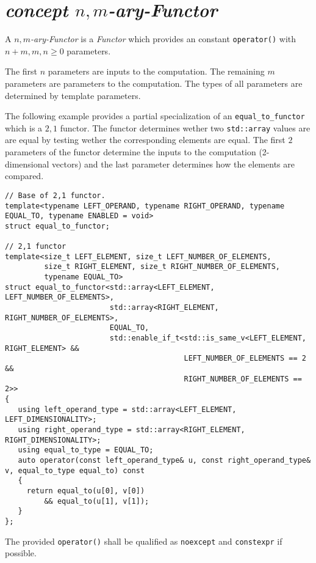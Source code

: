 \section{\textit{concept $n,m$-ary-Functor}}
A \textit{$n,m$-ary-Functor} is a \textit{Functor} which provides an constant \texttt{operator()} with $n+m, m, n \geq 0$ parameters.\newline

\noindent{}The first $n$ parameters are inputs to the computation.
The remaining $m$ parameters are parameters to the computation.
The types of all parameters are determined by template parameters.

\noindent{}The following example provides a partial specialization of an \texttt{equal\_to\_functor} which is a $2,1$ functor.
The functor determines wether two \texttt{std::array} values are are equal by testing wether the corresponding elements
are equal. The first $2$ parameters of the functor determine the inputs to the computation (2-dimensional vectors) and
the last parameter determines how the elements are compared.
\begin{verbatim}
// Base of 2,1 functor.
template<typename LEFT_OPERAND, typename RIGHT_OPERAND, typename EQUAL_TO, typename ENABLED = void>
struct equal_to_functor;

// 2,1 functor
template<size_t LEFT_ELEMENT, size_t LEFT_NUMBER_OF_ELEMENTS,
         size_t RIGHT_ELEMENT, size_t RIGHT_NUMBER_OF_ELEMENTS,
         typename EQUAL_TO>
struct equal_to_functor<std::array<LEFT_ELEMENT, LEFT_NUMBER_OF_ELEMENTS>,
                        std::array<RIGHT_ELEMENT, RIGHT_NUMBER_OF_ELEMENTS>,
                        EQUAL_TO,
                        std::enable_if_t<std::is_same_v<LEFT_ELEMENT, RIGHT_ELEMENT> &&
                                         LEFT_NUMBER_OF_ELEMENTS == 2                &&
                                         RIGHT_NUMBER_OF_ELEMENTS == 2>>
{
   using left_operand_type = std::array<LEFT_ELEMENT, LEFT_DIMENSIONALITY>;
   using right_operand_type = std::array<RIGHT_ELEMENT, RIGHT_DIMENSIONALITY>;
   using equal_to_type = EQUAL_TO;
   auto operator(const left_operand_type& u, const right_operand_type& v, equal_to_type equal_to) const
   {
     return equal_to(u[0], v[0])
         && equal_to(u[1], v[1]);
   }
};
\end{verbatim}

\noindent{}The provided \texttt{operator()} shall be qualified as \texttt{noexcept} and \texttt{constexpr} if possible.\newline

